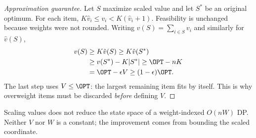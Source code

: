 \begin{proof}[Approximation guarantee]
Let $S$ maximize scaled value and let $S^*$ be an original optimum. For each item,
$K\hat v_i\le v_i<K(\hat v_i+1)$. Feasibility is unchanged because weights were not rounded.
Writing $v(S)=\sum_{i\in S}v_i$ and similarly for $\hat v(S)$,
\begin{align*}
v(S)&\ge K\hat v(S)\ge K\hat v(S^*)\\
&\ge v(S^*)-K|S^*|\ge\OPT-nK\\
&=\OPT-\epsilon V\ge(1-\epsilon)\OPT.
\end{align*}
The last step uses $V\le\OPT$: the largest remaining item fits by itself. This is why
overweight items must be discarded \emph{before} defining $V$.
\end{proof}
Scaling values does not reduce the state space of a weight-indexed $O(nW)$ DP. Neither
$V$ nor $W$ is a constant; the improvement comes from bounding the scaled coordinate.

